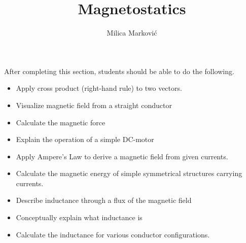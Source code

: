 \documentclass{ximera}
\title{Magnetostatics}
\author{Milica Markovi{\'c}}
\begin{document}
\begin{abstract}
\end{abstract}

\maketitle

\begin{sectionOutcomes}

After completing this section, students should be able to do the following.

\begin{itemize}
\item Apply cross product (right-hand rule) to two vectors.
\item Visualize magnetic field from a straight conductor
\item Calculate the magnetic force
\item Explain the operation of a simple DC-motor
\item Apply Ampere's Law to derive a magnetic field from given currents.
\item Calculate the magnetic energy of simple symmetrical structures carrying currents.
\item Describe inductance through a flux of the magnetic field
\item Conceptually explain what inductance is
\item Calculate the inductance for various conductor configurations.
\end{itemize}

\end{sectionOutcomes}
\end{document}
